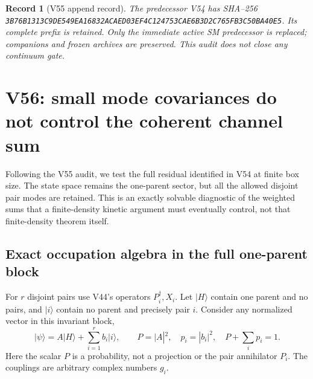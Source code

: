 \documentclass[11pt]{article}
\newtheorem{record}[theorem]{Record}
\theoremstyle{remark}
\begin{document}
\begin{record}[V55 append record]
\label{rec:v20v55}
The predecessor V54 has SHA--256
\texttt{3B76B1313C9DE549EA16832ACAED03EF4C124753CAE6B3D2C765FB3C50BA40E5}.
Its complete prefix is retained.  Only the immediate active SM
predecessor is replaced; companions and frozen archives are
preserved.  This audit does not close any continuum gate.
\end{record}


\section{V56: small mode covariances do not control the coherent channel sum}
\label{sec:v20v56}

Following the V55 audit, we test the full residual identified
in V54 at finite box size.  The state space remains the
one-parent sector, but all the allowed disjoint pair modes
are retained.  This is an exactly solvable diagnostic of the
weighted sums that a finite-density kinetic argument must
eventually control, not that finite-density theorem itself.

\subsection{Exact occupation algebra in the full one-parent block}

For \(r\) disjoint pairs use V44's operators \(P_i^\dagger,X_i\).
Let \(|H\rangle\) contain one parent and no pairs, and
\(|i\rangle\) contain no parent and precisely pair \(i\).
Consider any normalized vector in this invariant block,
\[
 |\psi\rangle=A|H\rangle+\sum_{i=1}^r b_i|i\rangle,\qquad
 P=|A|^2,\quad p_i=|b_i|^2,\quad P+\sum_i p_i=1.
\]
Here the scalar \(P\) is a probability, not a projection or
the pair annihilator \(P_i\).  The couplings are arbitrary
complex numbers \(g_i\).
\end{document}
